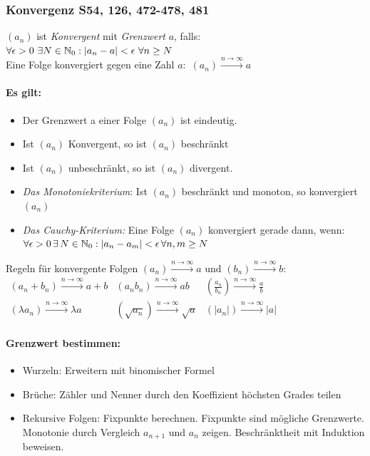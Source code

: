 \subsubsection{Konvergenz \color{red} S54, 126, 472-478, 481}
$(a_n)$ ist \emph{Konvergent} mit \emph{Grenzwert} $a$, falls: $\forall \epsilon > 0 \ \exists N  \in \mathbb N_0:  \left\vert a_n -a\right\vert < \epsilon \ \forall n \ge N$\\
Eine Folge konvergiert gegen eine Zahl $a$:\ $(a_n) \overset{n \rightarrow \infty}{\longrightarrow} a$
\paragraph{Es gilt:}
\begin{itemize}\itemsep0pt
\item Der Grenzwert a einer Folge $(a_n)$ ist eindeutig.
\item Ist $(a_n)$ Konvergent, so ist $(a_n)$ beschränkt
\item Ist $(a_n)$ unbeschränkt, so ist $(a_n)$ divergent.
\item \emph{Das Monotoniekriterium}: Ist $(a_n)$ beschränkt und monoton, so konvergiert $(a_n)$
\item \emph{Das Cauchy-Kriterium:} Eine Folge $(a_n)$ konvergiert gerade dann, wenn: \\ $\forall \epsilon >0 \, \exists \,  N \in \mathbb N_0: \left\vert a_n - a_m\right\vert < \epsilon \, \forall n, m \ge N$
\end{itemize}
Regeln für konvergente Folgen $(a_n) \overset{n \rightarrow \infty}{\longrightarrow} a$ und $(b_n) \overset{n \rightarrow \infty}{\longrightarrow} b$:\\
$\begin{array}{lll}
(a_n+b_n) \overset{n \rightarrow \infty}{\longrightarrow} a+b & (a_n b_n) \overset{n \rightarrow \infty}{\longrightarrow} ab & (\frac{a_n}{b_n}) \overset{n \rightarrow \infty}{\longrightarrow} \frac{a}{b}\\
(\lambda a_n) \overset{n \rightarrow \infty}{\longrightarrow} \lambda a & (\sqrt{a_n}) \overset{n \rightarrow \infty}{\longrightarrow} \sqrt{a} & (|a_n|) \overset{n \rightarrow \infty}{\longrightarrow} |a|
\end{array}$
\paragraph{Grenzwert bestimmen:}
\begin{itemize}\itemsep0pt
\item Wurzeln: Erweitern mit binomischer Formel
\item Brüche: Zähler und Nenner durch den Koeffizient höchsten Grades teilen
\item Rekursive Folgen: Fixpunkte berechnen. Fixpunkte sind mögliche Grenzwerte. Monotonie durch Vergleich $a_{n+1}$ und $a_n$ zeigen. Beschränktheit mit Induktion beweisen.
\end{itemize}

